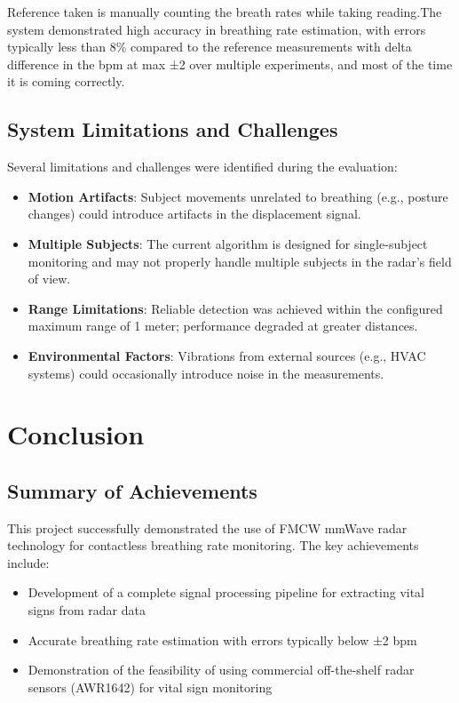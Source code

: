 \documentclass[12pt]{article}
\begin{document}
Reference taken is manually counting the breath rates while taking reading.The system demonstrated high accuracy in breathing rate estimation, with errors typically less than 8\% compared to the reference measurements with delta difference in the bpm at max ±2 over multiple experiments, and most of the time it is coming correctly.

\subsection{System Limitations and Challenges}
Several limitations and challenges were identified during the evaluation:

\begin{itemize}
    \item \textbf{Motion Artifacts}: Subject movements unrelated to breathing (e.g., posture changes) could introduce artifacts in the displacement signal.
    
    \item \textbf{Multiple Subjects}: The current algorithm is designed for single-subject monitoring and may not properly handle multiple subjects in the radar's field of view.
    
    \item \textbf{Range Limitations}: Reliable detection was achieved within the configured maximum range of 1 meter; performance degraded at greater distances.
    
    \item \textbf{Environmental Factors}: Vibrations from external sources (e.g., HVAC systems) could occasionally introduce noise in the measurements.
\end{itemize}

\section{Conclusion}

\subsection{Summary of Achievements}
This project successfully demonstrated the use of FMCW mmWave radar technology for contactless breathing rate monitoring. The key achievements include:

\begin{itemize}
    \item Development of a complete signal processing pipeline for extracting vital signs from radar data
    \item Accurate breathing rate estimation with errors typically below ±2 bpm
    \item Demonstration of the feasibility of using commercial off-the-shelf radar sensors (AWR1642) for vital sign monitoring
\end{itemize}
\end{document}
